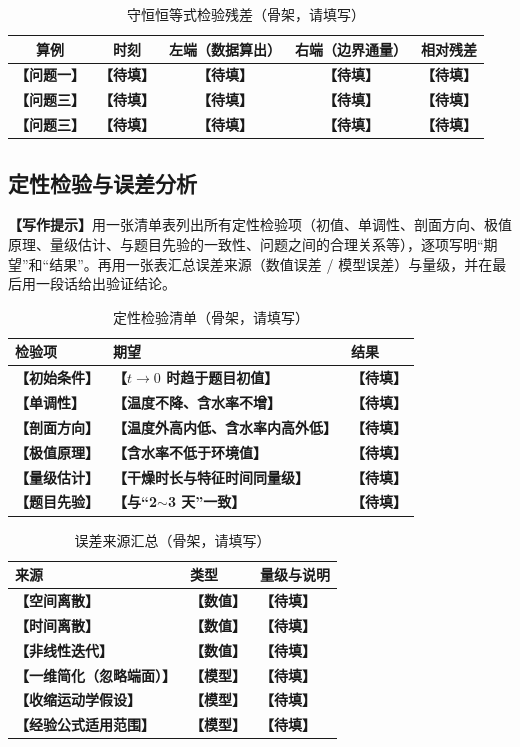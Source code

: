 \documentclass[12pt,a4paper]{article}
\newcommand{\prompt}[1]{\par\noindent\textbf{【写作提示】}#1\par}      %
\newcommand{\ph}[1]{\textbf{【#1】}}                                   %
\begin{document}
\begin{table}[H]
\centering
\caption{守恒恒等式检验残差（骨架，请填写）}
\label{tab:balance}
\begin{tabular}{ccccc}
\toprule
算例 & 时刻 & 左端（数据算出） & 右端（边界通量） & 相对残差\\
\midrule
\ph{问题一} & \ph{待填} & \ph{待填} & \ph{待填} & \ph{待填}\\
\ph{问题三} & \ph{待填} & \ph{待填} & \ph{待填} & \ph{待填}\\
\ph{问题三} & \ph{待填} & \ph{待填} & \ph{待填} & \ph{待填}\\
\bottomrule
\end{tabular}
\end{table}

\subsection{定性检验与误差分析}

\prompt{用一张清单表列出所有定性检验项（初值、单调性、剖面方向、极值原理、量级估计、与题目先验的一致性、问题之间的合理关系等），逐项写明“期望”和“结果”。再用一张表汇总误差来源（数值误差 / 模型误差）与量级，并在最后用一段话给出验证结论。}

\begin{table}[H]
\centering
\caption{定性检验清单（骨架，请填写）}
\label{tab:qualitative}
\begin{tabular}{p{3.6cm}p{6.2cm}p{4.4cm}}
\toprule
检验项 & 期望 & 结果\\
\midrule
\ph{初始条件} & \ph{$t\to0$ 时趋于题目初值} & \ph{待填}\\
\ph{单调性} & \ph{温度不降、含水率不增} & \ph{待填}\\
\ph{剖面方向} & \ph{温度外高内低、含水率内高外低} & \ph{待填}\\
\ph{极值原理} & \ph{含水率不低于环境值} & \ph{待填}\\
\ph{量级估计} & \ph{干燥时长与特征时间同量级} & \ph{待填}\\
\ph{题目先验} & \ph{与“2$\sim$3 天”一致} & \ph{待填}\\
\bottomrule
\end{tabular}
\end{table}

\begin{table}[H]
\centering
\caption{误差来源汇总（骨架，请填写）}
\label{tab:error-source}
\begin{tabular}{p{4.4cm}p{2.6cm}p{7.2cm}}
\toprule
来源 & 类型 & 量级与说明\\
\midrule
\ph{空间离散} & \ph{数值} & \ph{待填}\\
\ph{时间离散} & \ph{数值} & \ph{待填}\\
\ph{非线性迭代} & \ph{数值} & \ph{待填}\\
\ph{一维简化（忽略端面）} & \ph{模型} & \ph{待填}\\
\ph{收缩运动学假设} & \ph{模型} & \ph{待填}\\
\ph{经验公式适用范围} & \ph{模型} & \ph{待填}\\
\bottomrule
\end{tabular}
\end{table}
\end{document}
